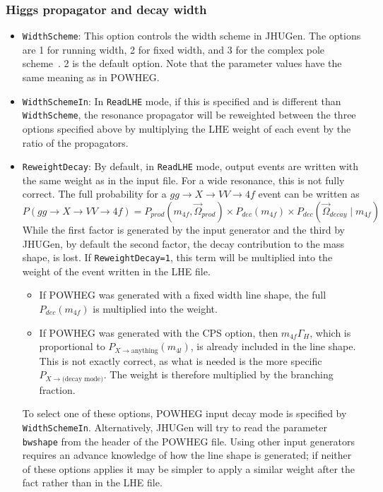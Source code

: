 \documentclass[aps,superscriptaddress,nofootinbib]{revtex4}
\begin{document}
\subsubsection{Higgs propagator and decay width}
\begin{itemize}
\item \verb|WidthScheme|: This option controls the width scheme in JHUGen. The options are 1 for running width, 2 for fixed width, and 3 for the complex pole scheme~\cite{Passarino:2010qk,Goria:2011wa}. 2 is the default option.  Note that the parameter values have the same meaning as in POWHEG.
\item \verb|WidthSchemeIn|: In \verb|ReadLHE| mode, if this is specified and is different than \verb|WidthScheme|, the resonance propagator will be reweighted between the three options specified above by multiplying the LHE weight of each event by the ratio of the propagators.
\item \verb|ReweightDecay|: By default, in \verb|ReadLHE| mode, output events are written with the same weight as in the input file.  For a wide resonance, this is not fully correct.  The full probability for a $gg\to X\to VV\to 4f$ event can be written as
\[
P(gg\to X\to VV\to 4f)=P_{prod}(m_{4f},\vec{\Omega}_{prod})\times P_{dec}(m_{4f})\times P_{dec}(\vec{\Omega}_{decay}\mid m_{4f})
\]
While the first factor is generated by the input generator and the third by JHUGen, by default the second factor, the decay contribution to the mass shape, is lost.  If \verb|ReweightDecay=1|, this term will be multiplied into the weight of the event written in the LHE file.
\begin{itemize}
\item If POWHEG was generated with a fixed width line shape, the full $P_{dec}(m_{4f})$ is multiplied into the weight.
\item If POWHEG was generated with the CPS option, then $m_{4f}\Gamma_H$, which is proportional to $P_{X\to \text{anything}}(m_{4l})$, is already included in the line shape.  This is not exactly correct, as what is needed is the more specific $P_{X\to\text{(decay mode)}}$.  The weight is therefore multiplied by the branching fraction.
\end{itemize}
To select one of these options, POWHEG input decay mode is specified by \verb|WidthSchemeIn|.  Alternatively, JHUGen will try to read the parameter \verb|bwshape| from the header of the POWHEG file.  Using other input generators requires an advance knowledge of how the line shape is generated; if neither of these options applies it may be simpler to apply a similar weight after the fact rather than in the LHE file.

\end{itemize}
\end{document}
